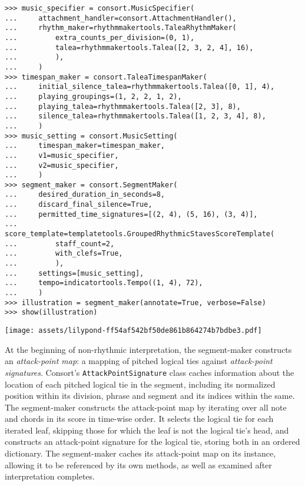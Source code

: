 \begin{abjadbookoutput}
\begin{singlespacing}
\vspace{-0.5\baselineskip}
\begin{lstlisting}
>>> music_specifier = consort.MusicSpecifier(
...     attachment_handler=consort.AttachmentHandler(),
...     rhythm_maker=rhythmmakertools.TaleaRhythmMaker(
...         extra_counts_per_division=(0, 1),
...         talea=rhythmmakertools.Talea([2, 3, 2, 4], 16),
...         ),
...     )
>>> timespan_maker = consort.TaleaTimespanMaker(
...     initial_silence_talea=rhythmmakertools.Talea([0, 1], 4),
...     playing_groupings=(1, 2, 2, 1, 2),
...     playing_talea=rhythmmakertools.Talea([2, 3], 8),
...     silence_talea=rhythmmakertools.Talea([1, 2, 3, 4], 8),
...     )
>>> music_setting = consort.MusicSetting(
...     timespan_maker=timespan_maker,
...     v1=music_specifier,
...     v2=music_specifier,
...     )
>>> segment_maker = consort.SegmentMaker(
...     desired_duration_in_seconds=8,
...     discard_final_silence=True,
...     permitted_time_signatures=[(2, 4), (5, 16), (3, 4)],
...     score_template=templatetools.GroupedRhythmicStavesScoreTemplate(
...         staff_count=2,
...         with_clefs=True,
...         ),
...     settings=[music_setting],
...     tempo=indicatortools.Tempo((1, 4), 72),
...     )
>>> illustration = segment_maker(annotate=True, verbose=False)
>>> show(illustration)
\end{lstlisting}
\noindent\texttt{[image: assets/lilypond-ff54af542bf50de861b864274b7bdbe3.pdf]}
\end{singlespacing}
\end{abjadbookoutput}

\noindent At the beginning of non-rhythmic interpretation, the segment-maker
constructs an \emph{attack-point map}: a mapping of pitched logical ties
against \emph{attack-point signatures}. Consort's \texttt{AttackPointSignature}
class caches information about the location of each pitched logical tie in the
segment, including its normalized position within its division, phrase and
segment and its indices within the same. The segment-maker constructs the
attack-point map by iterating over all note and chords in its score in
time-wise order. It selects the logical tie for each iterated leaf, skipping
those for which the leaf is not the logical tie's head, and constructs an
attack-point signature for the logical tie, storing both in an ordered
dictionary. The segment-maker caches its attack-point map on its instance,
allowing it to be referenced by its own methods, as well as examined after
interpretation completes.


